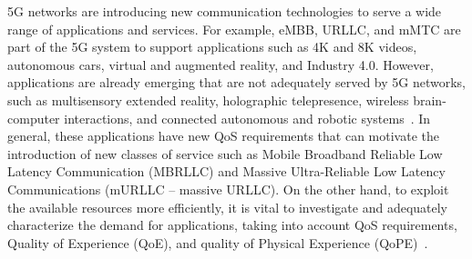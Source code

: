 5G networks are introducing new communication technologies to serve a wide range of applications and services. For example, eMBB, URLLC, and mMTC are part of the 5G system to support applications such as 4K and 8K videos, autonomous cars, virtual and augmented reality, and Industry 4.0. However, applications are already emerging that are not adequately served by 5G networks, such as multisensory extended reality, holographic telepresence, wireless brain-computer interactions, and connected autonomous and robotic systems~\cite{saad:19, giordani:20}. In general, these applications have new QoS requirements that can motivate the introduction of new classes of service such as Mobile Broadband
Reliable Low Latency Communication (MBRLLC) and Massive Ultra-Reliable Low Latency Communications (mURLLC -- massive URLLC). On the other hand, to exploit the available resources more efficiently, it is vital to investigate and adequately characterize the demand for applications, taking into account QoS requirements, Quality of Experience (QoE), and quality of Physical Experience (QoPE)~\cite{saad:19, taleb:19}.